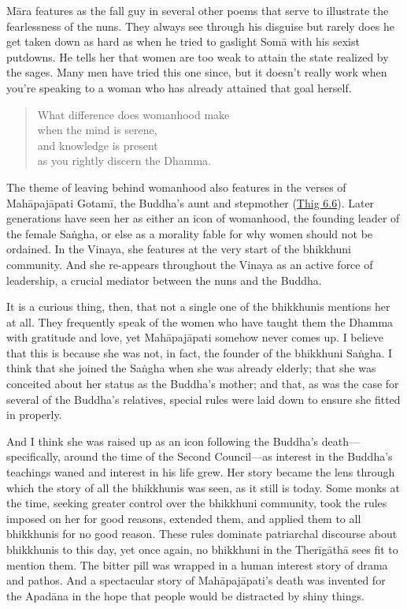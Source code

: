 \documentclass[12pt,openany]{book}%
\begin{document}
\textsanskrit{Māra} features as the fall guy in several other poems that serve to illustrate the fearlessness of the nuns. They always see through his disguise but rarely does he get taken down as hard as when he tried to gaslight \textsanskrit{Somā} with his sexist putdowns. He tells her that women are too weak to attain the state realized by the sages. Many men have tried this one since, but it doesn’t really work when you’re speaking to a woman who has already attained that goal herself.

\begin{quotation}%
What difference does womanhood make \\
when the mind is serene, \\
and knowledge is present \\
as you rightly discern the Dhamma.

%
\end{quotation}

The theme of leaving behind womanhood also features in the verses of \textsanskrit{Mahāpajāpati} \textsanskrit{Gotamī}, the Buddha’s aunt and stepmother (\href{https://suttacentral.net/thig6.6}{Thig 6.6}). Later generations have seen her as either an icon of womanhood, the founding leader of the female \textsanskrit{Saṅgha}, or else as a morality fable for why women should not be ordained. In the Vinaya, she features at the very start of the bhikkhuni community. And she re-appears throughout the Vinaya as an active force of leadership, a crucial mediator between the nuns and the Buddha.

It is a curious thing, then, that not a single one of the bhikkhunis mentions her at all. They frequently speak of the women who have taught them the Dhamma with gratitude and love, yet \textsanskrit{Mahāpajāpati} somehow never comes up. I believe that this is because she was not, in fact, the founder of the bhikkhuni \textsanskrit{Saṅgha}. I think that she joined the \textsanskrit{Saṅgha} when she was already elderly; that she was conceited about her status as the Buddha’s mother; and that, as was the case for several of the Buddha’s relatives, special rules were laid down to ensure she fitted in properly.

And I think she was raised up as an icon following the Buddha’s death—specifically, around the time of the Second Council—as interest in the Buddha’s teachings waned and interest in his life grew. Her story became the lens through which the story of all the bhikkhunis was seen, as it still is today. Some monks at the time, seeking greater control over the bhikkhuni community, took the rules imposed on her for good reasons, extended them, and applied them to all bhikkhunis for no good reason. These rules dominate patriarchal discourse about bhikkhunis to this day, yet once again, no bhikkhuni in the \textsanskrit{Therīgāthā} sees fit to mention them. The bitter pill was wrapped in a human interest story of drama and pathos. And a spectacular story of \textsanskrit{Mahāpajāpati}’s death was invented for the \textsanskrit{Apadāna} in the hope that people would be distracted by shiny things.
\end{document}
